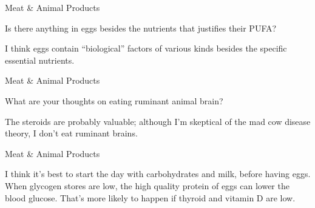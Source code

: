\documentclass[11pt,oneside,openany,extrafontsizes]{memoir}
\begin{document}
\begin{qaexchange}{Meat \& Animal Products}

    \begin{question}
        Is there anything in eggs besides the nutrients that justifies their PUFA?
    \end{question}

    \begin{answer}
      I think eggs contain \enquote{biological} factors of various kinds besides the specific essential nutrients.
    \end{answer}
\end{qaexchange}

\begin{qaexchange}{Meat \& Animal Products}

    \begin{question}
        What are your thoughts on eating ruminant animal brain?
    \end{question}

    \begin{answer}
       The steroids are probably valuable; although I'm skeptical of the mad cow disease theory, I don't eat ruminant brains. 
    \end{answer}
\end{qaexchange}

\begin{standalonequote}{Meat \& Animal Products}

    \begin{answer}
      I think it's best to start the day with carbohydrates and milk, before having eggs. When glycogen stores are low, the high quality protein of eggs can lower the blood glucose. That's more likely to happen if thyroid and vitamin D are low.
    \end{answer}
\end{standalonequote}
\end{document}
